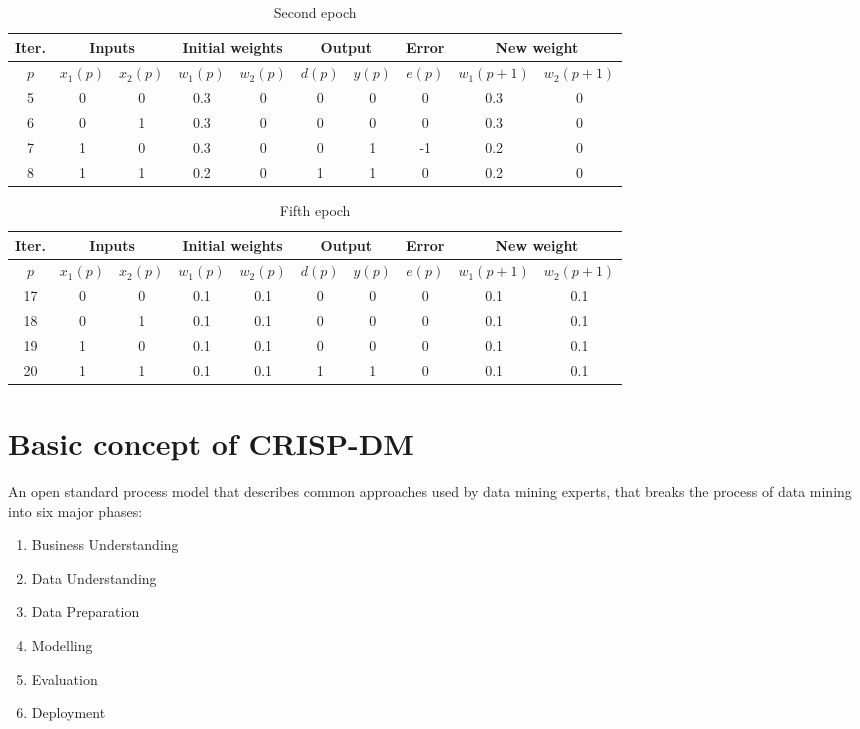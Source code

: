 \documentclass[a4paper,12pt,answers]{article}
\begin{document}
	\begin{table}[H]
		\centering
		\begin{tabular}{|c|c|c|c|c|c|c|c|c|c|}
			\hline
			Iter. & \multicolumn{2}{c|}{Inputs} & \multicolumn{2}{c|}{Initial weights} & \multicolumn{2}{c|}{Output} & Error & \multicolumn{2}{c|}{New weight} \\
			\hline
			$p$ & $x_1(p)$ & $x_2(p)$ & $w_1(p)$ & $w_2(p)$ &$d(p)$ & $y(p)$ & $e(p)$ & $w_1(p+1)$ & $w_2(p+1)$ \\ \hline
			5 & 0 & 0 & 0.3 & 0    & 0 & 0 & 0 & 0.3 & 0 \\
			6 & 0 & 1 & 0.3 & 0 & 0 & 0 & 0 & 0.3 & 0 \\
			7 & 1 & 0 & 0.3 & 0 & 0 & 1 & -1& 0.2 & 0 \\
			8 & 1 & 1 & 0.2 & 0 & 1 & 1 & 0 & 0.2 &  0 \\
			\hline
		\end{tabular}
		\caption{Second epoch}
	\end{table}
	
	\begin{table}[H]
		\centering
		\begin{tabular}{|c|c|c|c|c|c|c|c|c|c|}
			\hline
			Iter. & \multicolumn{2}{c|}{Inputs} & \multicolumn{2}{c|}{Initial weights} & \multicolumn{2}{c|}{Output} & Error & \multicolumn{2}{c|}{New weight} \\
			\hline
			$p$ & $x_1(p)$ & $x_2(p)$ & $w_1(p)$ & $w_2(p)$ &$d(p)$ & $y(p)$ & $e(p)$ & $w_1(p+1)$ & $w_2(p+1)$ \\ \hline
			17 & 0 & 0 & 0.1 & 0.1    & 0 & 0 & 0 & 0.1 & 0.1 \\
			18 & 0 & 1 & 0.1 & 0.1 & 0 & 0 & 0 & 0.1 & 0.1 \\
			19 & 1 & 0 & 0.1 & 0.1 & 0 & 0 & 0 & 0.1 & 0.1 \\
			20 & 1 & 1 & 0.1 & 0.1 & 1 & 1 & 0 & 0.1 & 0.1 \\
			\hline
		\end{tabular}
		\caption{Fifth epoch}
	\end{table}
	
	
	
	\newpage
	\section{Basic concept of CRISP-DM}
	An open standard process model that describes common approaches used by data mining experts, that breaks the process of data mining into six major phases:
	\begin{enumerate}
		\item Business Understanding
		\item Data Understanding
		\item Data Preparation
		\item Modelling
		\item Evaluation
		\item Deployment
	\end{enumerate}
\end{document}
